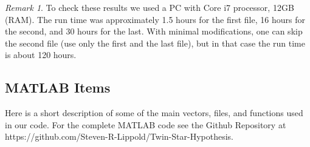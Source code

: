 \documentclass[reqno,11pt]{amsart}
\theoremstyle{definition}
\theoremstyle{remark}
\newtheorem{remark}[theorem]{Remark}
\numberwithin{equation}{section}
\begin{document}
\begin{remark} To check these results we used a PC with Core i7 processor, 12GB (RAM).  The run time was approximately  1.5 hours for the first file, 16 hours for the second, and 30 hours for the last.  With minimal modifications, one can skip the second file  (use only the first and the last file), but in that case the run time is about 120 hours. 
\end{remark}

\subsection{MATLAB Items}
Here is a short description of some of the main vectors, files, and functions used in our code.  For the complete MATLAB code see the Github Repository at https://github.com/Steven-R-Lippold/Twin-Star-Hypothesis.  
\end{document}
